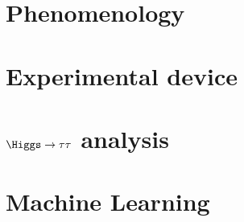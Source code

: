 \subsection*{}
\section{Phenomenology}


\subsection*{}
\section{Experimental device}

%

\subsection*{}
\section{$\Higgs\to\tau\tau$ analysis}


\subsection*{}
\section{Machine Learning}
